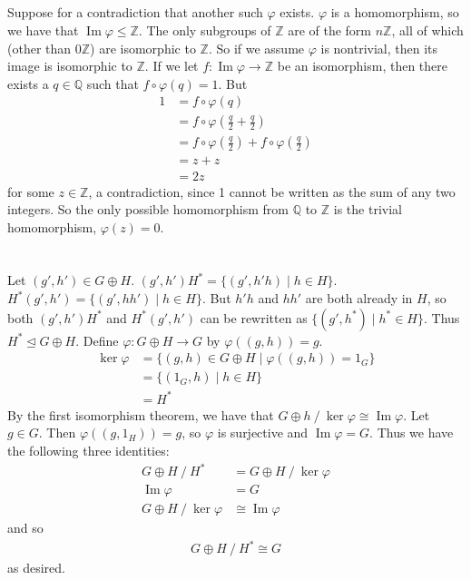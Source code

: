 \documentclass[11pt]{article}
\DeclareMathOperator{\im}{Im}
\begin{document}
\subsection{} %
Suppose for a contradiction that another such $\varphi$ exists. $\varphi$ is a
homomorphism, so we have that $\im\varphi\le\mathbb{Z}$. The only subgroups of
$\mathbb{Z}$ are of the form $n\mathbb{Z}$, all of which (other than
$0\mathbb{Z}$) are isomorphic to $\mathbb{Z}$. So if we assume $\varphi$ is
nontrivial, then its image is isomorphic to $\mathbb{Z}$.  If we let
$f:\im\varphi\rightarrow\mathbb{Z}$ be an isomorphism, then there exists a
$q\in\mathbb{Q}$ such that $f\circ\varphi(q)=1$. But
\begin{align*}
	1&=f\circ\varphi(q)\\
	&=f\circ\varphi(\frac{q}{2}+\frac{q}{2})\\
	&=f\circ\varphi(\frac{q}{2})+f\circ\varphi(\frac{q}{2})\\
	&=z+z\\
	&=2z
\end{align*}
for some $z\in\mathbb{Z}$, a contradiction, since 1 cannot be written as the
sum of any two integers. So the only possible homomorphism from $\mathbb{Q}$ to
$\mathbb{Z}$ is the trivial homomorphism, $\varphi(z)=0$.


\section{} %
Let $(g',h')\in G\oplus H$. $(g',h')H^*=\{(g',h'h)\mid h\in H\}$.
$H^*(g',h')=\{(g',hh')\mid h\in H\}$. But $h'h$ and $hh'$ are both already in
$H$, so both $(g',h')H^*$ and $H^*(g',h')$ can be rewritten as
$\{(g', h^*)\mid h^*\in H\}$. Thus $H^*\trianglelefteq G\oplus H$.
\newline
\newline
Define $\varphi:G\oplus H\rightarrow G$ by $\varphi((g,h))=g$.
\begin{align*}
	\ker\varphi&=\{(g,h)\in G\oplus H\mid\varphi((g,h))=1_G\}\\
	&=\{(1_G,h)\mid h\in H\}\\
	&= H^*
\end{align*}
By the first isomorphism theorem, we have that
$G\oplus h\mathbin/\ker\varphi\cong\im\varphi$. Let $g\in G$. Then
$\varphi((g,1_H))=g$, so $\varphi$ is surjective and $\im\varphi=G$. Thus we
have the following three identities:
\begin{align*}
	G\oplus H\mathbin/H^*&=G\oplus H\mathbin/\ker\varphi\\
	\im\varphi&=G\\
	G\oplus H\mathbin/\ker\varphi&\cong\im\varphi
\end{align*}
and so
\begin{align*}
	G\oplus H\mathbin/H^*\cong G
\end{align*}
as desired.
\end{document}

